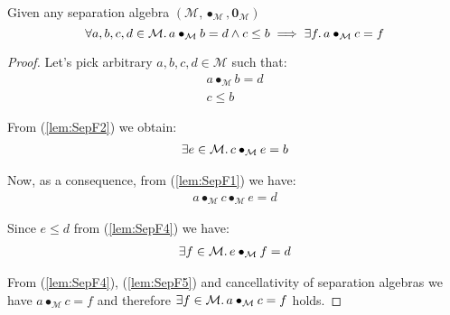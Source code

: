 \lem \label{lem:SepF} Given any separation algebra $(\mathcal{M}, \bullet_\mathcal{M}, \mathbf{0}_\mathcal{M})$
\[
	\forall a, b, c, d \in \mathcal{M} \ldotp a \bullet_\mathcal{M} b = d \land c \leq b \implies \exists f \ldotp a \bullet_\mathcal{M} c = f
\]

{\parindent0pt
\begin{proof}
Let's pick arbitrary $a, b, c, d \in \mathcal{M}$ such that:
\begin{gather}
	\label{lem:SepF1} a \bullet_\mathcal{M} b = d
	\\
	\label{lem:SepF2} c \leq b
\end{gather}

From (\ref{lem:SepF2}) we obtain:
\begin{gather}
	\label{lem:SepF3} \exists e \in \mathcal{M} \ldotp c \bullet_\mathcal{M} e = b
\end{gather}

Now, as a consequence, from (\ref{lem:SepF1}) we have:
\begin{gather}
	\label{lem:SepF4} a \bullet_\mathcal{M} c \bullet_\mathcal{M} e = d
\end{gather}

Since $e \leq d$ from (\ref{lem:SepF4}) we have:
\begin{gather}
	\label{lem:SepF5} \exists f \in \mathcal{M} \ldotp e \bullet_\mathcal{M} f = d
\end{gather}

From (\ref{lem:SepF4}), (\ref{lem:SepF5}) and cancellativity of separation algebras we have $a \bullet_\mathcal{M} c = f$ and therefore $\exists f \in \mathcal{M} \ldotp a \bullet_\mathcal{M} c = f$ holds.
\end{proof}
}

